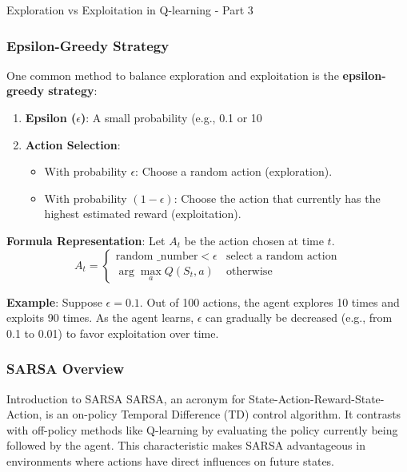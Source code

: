 \documentclass[aspectratio=169]{beamer}
\begin{document}
\begin{frame}[fragile]{Exploration vs Exploitation in Q-learning - Part 3}
    \frametitle{Epsilon-Greedy Strategy}
    One common method to balance exploration and exploitation is the \textbf{epsilon-greedy strategy}:
    
    \begin{enumerate}
        \item \textbf{Epsilon ($\epsilon$)}: A small probability (e.g., 0.1 or 10%
        \item \textbf{Action Selection}:
        \begin{itemize}
            \item With probability $\epsilon$: Choose a random action (exploration).
            \item With probability $(1 - \epsilon)$: Choose the action that currently has the highest estimated reward (exploitation).
        \end{itemize}
    \end{enumerate}
    
    \textbf{Formula Representation}:
    Let $A_t$ be the action chosen at time $t$.
    \begin{equation}
        A_t =
        \begin{cases} 
            \text{random \_ number} < \epsilon & \text{select a random action} \\
            \arg\max_a Q(S_t, a) & \text{otherwise}
        \end{cases}
    \end{equation}
    
    \textbf{Example}:
    Suppose $\epsilon = 0.1$. Out of 100 actions, the agent explores 10 times and exploits 90 times. As the agent learns, $\epsilon$ can gradually be decreased (e.g., from 0.1 to 0.01) to favor exploitation over time.
\end{frame}

\begin{frame}[fragile]
    \frametitle{SARSA Overview}
    \begin{block}{Introduction to SARSA}
        SARSA, an acronym for State-Action-Reward-State-Action, is an on-policy Temporal Difference (TD) control algorithm. It contrasts with off-policy methods like Q-learning by evaluating the policy currently being followed by the agent. This characteristic makes SARSA advantageous in environments where actions have direct influences on future states.
    \end{block}
\end{frame}
\end{document}
